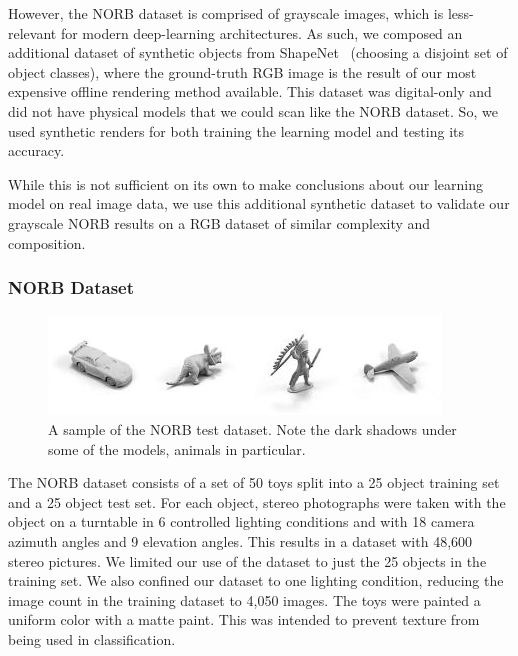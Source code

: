 \documentclass[10pt,twocolumn,letterpaper]{article}
\begin{document}
However, the NORB dataset is comprised of grayscale images, which is less-relevant for modern deep-learning architectures. As such, we composed an additional dataset of synthetic objects from ShapeNet~\cite{DBLP:journals/corr/ChangFGHHLSSSSX15} (choosing a disjoint set of object classes), where the ground-truth RGB image is the result of our most expensive offline rendering method available. This dataset was digital-only and did not have physical models that we could scan like the NORB dataset. So, we used synthetic renders for both training the learning model and testing its accuracy.

While this is not sufficient on its own to make conclusions about our learning model on real image data, we use this additional synthetic dataset to validate our grayscale NORB results on a RGB dataset of similar complexity and composition. %

\subsubsection{NORB Dataset}\label{NORB-DATASET}
\begin{figure}[h!]
\centering
\includegraphics[width=1.0\columnwidth]{./assets/NORBTestSmall.png}
\caption{A sample of the NORB test dataset. Note the dark shadows under some of the models, animals in particular.}
\label{fig:norb-samples}
\end{figure}

The NORB dataset consists of a set of 50 toys split into a 25 object training set and a 25 object test set. For each object, stereo photographs were taken with the object on a turntable in 6 controlled lighting conditions and with 18 camera azimuth angles and 9 elevation angles. This results in a dataset with 48,600 stereo pictures.  We limited our use of the dataset to just the 25 objects in the training set. We also confined our dataset to one lighting condition, reducing the image count in the training dataset to 4,050 images. The toys were painted a uniform color with a matte paint. This was intended to prevent texture from being used in classification.
\end{document}
